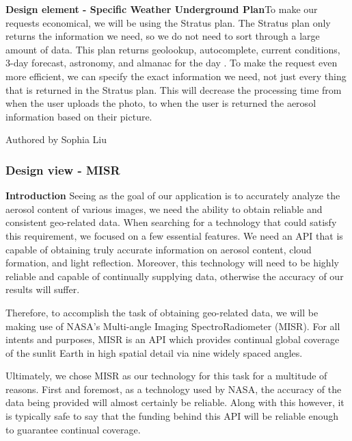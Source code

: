 \documentclass[onecolumn, draftclsnofoot,10pt, compsoc]{IEEEtran}
\begin{document}
\begin{flushleft}
\medskip

\textbf{Design element - Specific Weather Underground Plan}To make our requests economical, we will be using the Stratus plan.  The Stratus plan only returns the information we need, so we do not need to sort through a large amount of data. This plan returns geolookup, autocomplete, current conditions, 3-day forecast, astronomy, and almanac for the day \cite{3}. To make the request even more efficient, we can specify the exact information we need, not just every thing that is returned in the Stratus plan. This will decrease the processing time from when the user uploads the photo, to when the user is returned the aerosol information based on their picture.

\smallskip

\footnotesize Authored by Sophia Liu
\normalsize

\bigskip

\subsubsection{Design view - MISR}

\textbf{Introduction} Seeing as the goal of our application is to accurately analyze the aerosol content of various images, we need the ability to obtain reliable and consistent geo-related data.
When searching for a technology that could satisfy this requirement, we focused on a few essential features. We need an API that is capable of obtaining truly accurate information on aerosol content, cloud formation, and light reflection. Moreover, this technology will need to be highly reliable and capable of continually supplying data, otherwise the accuracy of our results will suffer. 

\medskip

Therefore, to accomplish the task of obtaining geo-related data, we will be making use of NASA’s Multi-angle Imaging SpectroRadiometer (MISR). For all intents and purposes, MISR is an API which provides continual global coverage of the sunlit Earth in high spatial detail via nine widely spaced angles. \cite{2}

\medskip

Ultimately, we chose MISR as our technology for this task for a multitude of reasons. First and foremost, as a technology used by NASA, the accuracy of the data being provided will almost certainly be reliable. Along with this however, it is typically safe to say that the funding behind this API will be reliable enough to guarantee continual coverage.


\end{flushleft}
\end{document}
